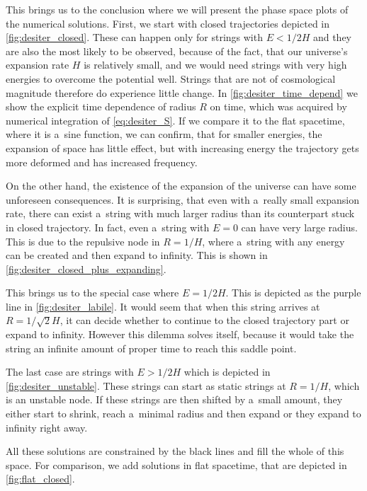 This brings us to the conclusion where we will present the phase space plots of the numerical solutions. First, we start with closed trajectories depicted in \cref{fig:desiter_closed}. These can happen only for strings with $E<1/2H$ and they are also the most likely to be observed, because of the fact, that our universe's expansion rate $H$ is relatively small, and we would need strings with very high energies to overcome the potential well. Strings that are not of cosmological magnitude therefore do experience little change. In \cref{fig:desiter_time_depend} we show the explicit time dependence of radius $R$ on time, which was acquired by numerical integration of \cref{eq:desiter_S}. If we compare it to the flat spacetime, where it is a~sine function, we can confirm, that for smaller energies, the expansion of space has little effect, but with increasing energy the trajectory gets more deformed and has increased frequency. 


On the other hand, the existence of the expansion of the universe can have some unforeseen consequences. It is surprising, that even with a~really small expansion rate, there can exist a~string with much larger radius than its counterpart stuck in closed trajectory. In fact, even a~string with $E = 0$ can have very large radius. This is due to the repulsive node in $R = 1/H$, where a~string with any energy can be created and then expand to infinity. This is shown in \cref{fig:desiter_closed_plus_expanding}.


This brings us to the special case where $E = 1/2H$. This is depicted as the purple line in \cref{fig:desiter_labile}. It would seem that when this string arrives at $R = 1/\sqrt{2}H$, it can decide whether to continue to the closed trajectory part or expand to infinity. However this dilemma solves itself, because it would take the string an infinite amount of proper time to reach this saddle point. 


The last case are strings with $E > 1/2H$ which is depicted in \cref{fig:desiter_unstable}. These strings can start as static strings at $R =1/H$, which is an unstable node. If these strings are then shifted by a~small amount, they either start to shrink, reach a~minimal radius and then expand or they expand to infinity right away.

All these solutions are constrained by the black lines and fill the whole of this space. For comparison, we add solutions in flat spacetime, that are depicted in \cref{fig:flat_closed}.

